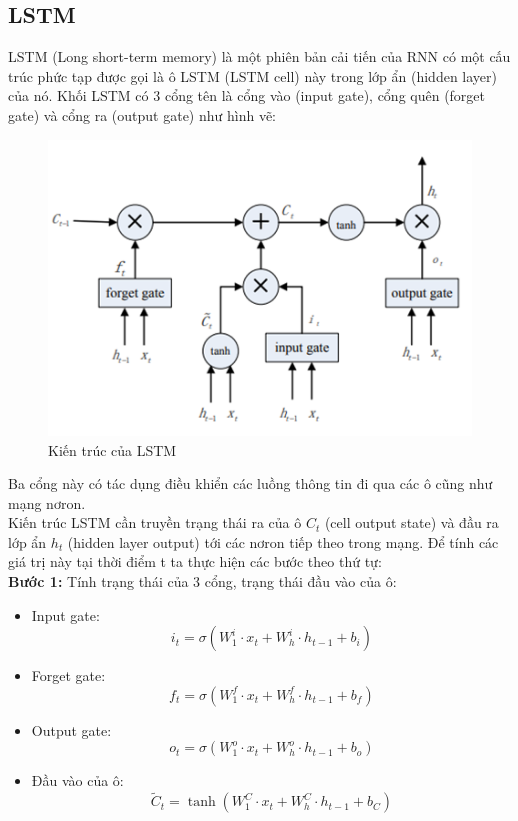 \documentclass[conference]{IEEEtran}
\begin{document}
\subsection{LSTM}
LSTM (Long short-term memory) là một phiên bản cải tiến của RNN có một cấu trúc phức tạp được gọi là ô LSTM (LSTM cell) này trong lớp ẩn (hidden layer) của nó. Khối LSTM có 3 cổng tên là cổng vào (input gate), cổng quên (forget gate) và cổng ra (output gate) như hình vẽ: \cite{LSTM}
\begin{figure}[H]
    \centering
    \begin{minipage}{0.8\linewidth}
    \centering
        \includegraphics[width=\linewidth]{images/LSTM.png}
    \caption{Kiến trúc của LSTM}
    \label{fig9}
    \end{minipage}
\end{figure}
Ba cổng này có tác dụng điều khiển các luồng thông tin đi qua các ô cũng như mạng nơron. \\
Kiến trúc LSTM cần truyền trạng thái ra của ô $C_t$ (cell output state) và đầu ra lớp ẩn $h_t$ (hidden layer output) tới các nơron tiếp theo trong mạng. Để tính các giá trị này tại thời điểm t ta thực hiện các bước theo thứ tự: \\
\textbf{Bước 1:} Tính trạng thái của 3 cổng, trạng thái đầu vào của ô:
\begin{itemize}
    \item Input gate:
    \[i_t = \sigma\left(W_1^i \cdot x_t + W_h^i \cdot h_{t-1} + b_i\right)\]
    \item Forget gate:
    \[f_t = \sigma\left(W_1^f \cdot x_t + W_h^f \cdot h_{t-1} + b_f\right)\]
    \item Output gate:
    \[o_t = \sigma\left(W_1^o \cdot x_t + W_h^o \cdot h_{t-1} + b_o\right)\]
    \item Đầu vào của ô:
    \[\tilde{C}_t = \tanh\left(W_1^C \cdot x_t + W_h^C \cdot h_{t-1} + b_C\right)\]
\end{itemize}
\end{document}
